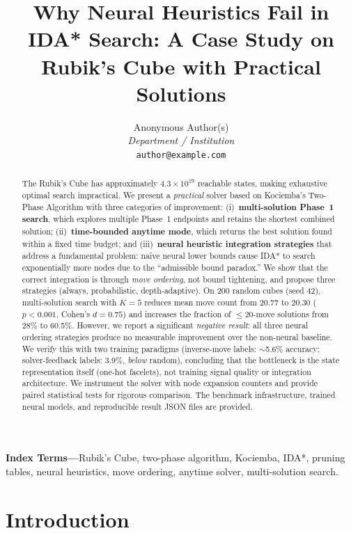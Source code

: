 \documentclass[10pt,twocolumn,a4paper]{article}
\title{\bf Why Neural Heuristics Fail in IDA* Search: A Case Study on Rubik's Cube with Practical Solutions}
\author{Anonymous Author(s)\\ \textit{Department / Institution}\\ \texttt{author@example.com}}
\date{}
\begin{document}
\maketitle

\begin{abstract}
The Rubik's Cube has approximately $4.3 \times 10^{19}$ reachable states, making exhaustive optimal search impractical. We present a \emph{practical} solver based on Kociemba's Two-Phase Algorithm with three categories of improvement: (i)~\textbf{multi-solution Phase~1 search}, which explores multiple Phase~1 endpoints and retains the shortest combined solution; (ii)~\textbf{time-bounded anytime mode}, which returns the best solution found within a fixed time budget; and (iii)~\textbf{neural heuristic integration strategies} that address a fundamental problem: na\"ive neural lower bounds cause IDA* to search exponentially more nodes due to the ``admissible bound paradox.'' We show that the correct integration is through \emph{move ordering}, not bound tightening, and propose three strategies (always, probabilistic, depth-adaptive). On 200 random cubes (seed 42), multi-solution search with $K=5$ reduces mean move count from 20.77 to 20.30 ($p < 0.001$, Cohen's $d = 0.75$) and increases the fraction of $\leq$20-move solutions from 28\% to 60.5\%. However, we report a significant \emph{negative result}: all three neural ordering strategies produce no measurable improvement over the non-neural baseline. We verify this with two training paradigms (inverse-move labels: $\sim$5.6\% accuracy; solver-feedback labels: 3.9\%, \emph{below} random), concluding that the bottleneck is the state representation itself (one-hot facelets), not training signal quality or integration architecture. We instrument the solver with node expansion counters and provide paired statistical tests for rigorous comparison. The benchmark infrastructure, trained neural models, and reproducible result JSON files are provided.
\end{abstract}

\noindent\textbf{Index Terms---}Rubik's Cube, two-phase algorithm, Kociemba, IDA*, pruning tables, neural heuristics, move ordering, anytime solver, multi-solution search.
\vspace{0.5em}

\section{Introduction}
\label{sec:intro}
\end{document}
